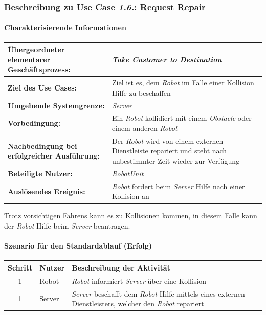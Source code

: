 		\subsubsection{Beschreibung zu Use Case \emph{1.6.}: Request Repair}

		\paragraph*{Charakterisierende Informationen}

		\begin{table}[H]
			\centering
			\begin{tabularx}{\textwidth}{|p{5cm}|X|}
				\hline
				\textbf{Übergeordneter elementarer Geschäftsprozess:} & \emph{Take Customer to Destination} \\ \hline
				\textbf{Ziel des Use Cases:} & Ziel ist es, dem \emph{Robot} im Falle einer Kollision Hilfe zu beschaffen \\ \hline
				\textbf{Umgebende Systemgrenze:} & \emph{Server}\\ \hline
				\textbf{Vorbedingung:} & Ein \emph{Robot} kollidiert mit einem \emph{Obstacle} oder einem anderen \emph{Robot} \\ \hline
				\textbf{Nachbedingung bei erfolgreicher Ausführung:} & Der \emph{Robot} wird von einem externen Dienstleiste repariert und steht nach unbestimmter Zeit wieder zur Verfügung \\ \hline
				\textbf{Beteiligte Nutzer:} & \emph{RobotUnit}\\ \hline
				\textbf{Auslösendes Ereignis:} & \emph{Robot} fordert beim \emph{Server} Hilfe nach einer Kollision an \\
				\hline
			\end{tabularx}
		\end{table}

		Trotz vorsichtigen Fahrens kann es zu Kollisionen kommen, in diesem Falle kann der \emph{Robot} Hilfe beim \emph{Server} beantragen.

		\paragraph*{Szenario für den Standardablauf (Erfolg)}

		\begin{table}[H]
			\centering
			\begin{tabularx}{\textwidth}{|c|p{2cm}|X|}
				\hline
				Schritt & Nutzer & Beschreibung der Aktivität \\ \hline
				1 & Robot & \emph{Robot} informiert \emph{Server} über eine Kollision \\
				1 & Server & \emph{Server} beschafft dem \emph{Robot} Hilfe mittels eines externen Dienstleisters, welcher den \emph{Robot} repariert \\
				\hline
			\end{tabularx}
		\end{table}


